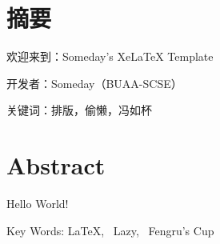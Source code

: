 
\xiaosi
\section*{摘要}

欢迎来到：Someday's XeLaTeX Template

开发者：Someday（BUAA-SCSE）

关键词：排版，偷懒，冯如杯


\clearpage

\section*{Abstract}

Hello World!

Key Words: \LaTeX, \ Lazy, \ Fengru's Cup

\clearpage
